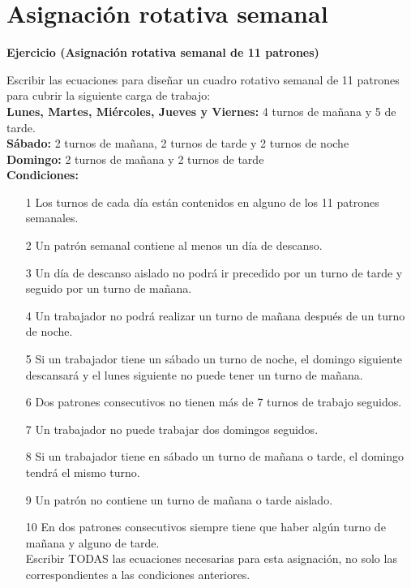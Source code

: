 \documentclass[a4paper,12pt]{article}
\newenvironment{exercise}[1]%
{%
  \par\vspace{\baselineskip}\noindent
  \textbf{Ejercicio (#1)}\begin{itshape}%
  \par\vspace{\baselineskip}\noindent\ignorespaces
}%
{%
  \end{itshape}\ignorespacesafterend
}
\begin{document}
\section{Asignaci\'on rotativa semanal}
\begin{exercise}{Asignaci\'on rotativa semanal de 11 patrones}

Escribir las ecuaciones para diseñar un cuadro rotativo semanal de 11 patrones para cubrir la siguiente carga de trabajo:\\

\textbf{Lunes, Martes, Mi\'ercoles, Jueves y Viernes:} 4 turnos de mañana y 5 de tarde.\\

\textbf{S\'abado:} 2 turnos de mañana, 2 turnos de tarde y 2 turnos de noche\\

\textbf{Domingo:} 2 turnos de mañana y 2 turnos de tarde\\

\textbf{Condiciones:}

\begin{itemize}
\item[1] Los turnos de cada d\'ia est\'an contenidos en alguno de los 11 patrones semanales. %
\item[2] Un patr\'on semanal contiene al menos un d\'ia de descanso. %
\item[3] Un d\'ia de descanso aislado no podr\'a ir precedido por un turno de tarde y seguido por un turno de mañana.%
\item[4] Un trabajador no podr\'a realizar un turno de mañana despu\'es de un turno de noche. %
\item[5] Si un trabajador tiene un s\'abado un turno de noche, el domingo siguiente descansar\'a y el lunes siguiente no puede tener un turno de mañana.
\item[6] Dos patrones consecutivos no tienen m\'as de 7 turnos de trabajo seguidos. %
\item[7] Un trabajador no puede trabajar dos domingos seguidos.%
\item[8] Si un trabajador tiene en s\'abado un turno de mañana o tarde, el domingo tendr\'a el mismo turno.%
\item[9] Un patr\'on no contiene un turno de mañana o tarde aislado.%
\item[10] En dos patrones consecutivos siempre tiene que haber alg\'un turno de mañana y alguno de tarde.\\%

Escribir TODAS las ecuaciones necesarias para esta asignaci\'on, no solo las correspondientes a las condiciones anteriores.
\end{itemize}

\end{exercise}
\end{document}
